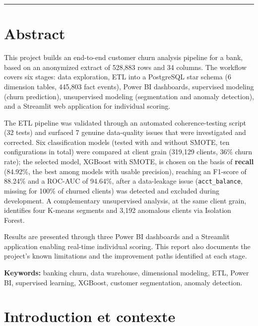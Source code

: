 \documentclass[11pt,a4paper]{report}
\begin{document}
\bigskip
\hrule
\bigskip

\chapter*{Abstract}

This project builds an end-to-end customer churn analysis pipeline for a bank,
based on an anonymized extract of 528,883 rows and 34 columns. The workflow
covers six stages: data exploration, ETL into a PostgreSQL star schema
(6 dimension tables, 445,803 fact events), Power BI dashboards, supervised
modeling (churn prediction), unsupervised modeling (segmentation and anomaly
detection), and a Streamlit web application for individual scoring.

The ETL pipeline was validated through an automated coherence-testing script
(32 tests) and surfaced 7 genuine data-quality issues that were investigated
and corrected. Six classification models (tested with and without SMOTE, ten
configurations in total) were compared at client grain (319,129 clients,
36\% churn rate); the selected model, XGBoost with SMOTE, is chosen on the
basis of \textbf{recall} (84.92\%, the best among models with usable
precision), reaching an F1-score of 88.24\% and a ROC-AUC of 94.64\%, after a
data-leakage issue (\texttt{acct\_balance}, missing for 100\% of churned
clients) was detected and excluded during development. A complementary
unsupervised analysis, at the same client grain, identifies four K-means
segments and 3,192 anomalous clients via Isolation Forest.

Results are presented through three Power BI dashboards and a Streamlit
application enabling real-time individual scoring. This report also documents
the project's known limitations and the improvement paths identified at each
stage.

\textbf{Keywords:} banking churn, data warehouse, dimensional modeling, ETL,
Power BI, supervised learning, XGBoost, customer segmentation, anomaly
detection.

\newpage
\tableofcontents
\newpage

\chapter{Introduction et contexte}
\end{document}
